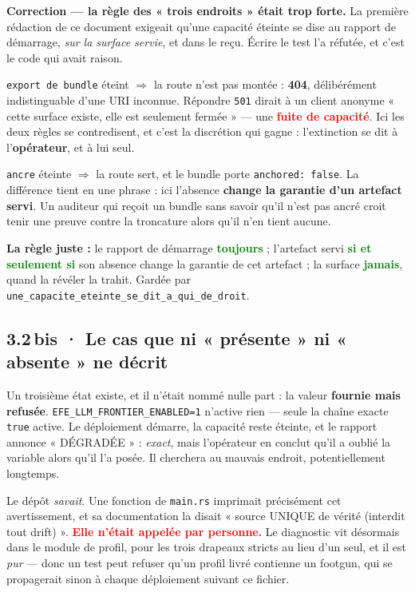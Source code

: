 \documentclass[10pt]{article}
\newcommand{\best}[1]{\textcolor{green}{\textbf{#1}}}
\newcommand{\pire}[1]{\textcolor{red}{\textbf{#1}}}
\newcommand{\code}[1]{\texttt{\small #1}}
\begin{document}
\begin{alerte}
\textbf{Correction --- la règle des « trois endroits » était trop forte.} La première rédaction de
ce document exigeait qu'une capacité éteinte se dise au rapport de démarrage, \emph{sur la surface
servie}, et dans le reçu. Écrire le test l'a réfutée, et c'est le code qui avait raison.

\code{export de bundle} éteint $\Rightarrow$ la route n'est pas montée : \textbf{404}, délibérément
indistinguable d'une URI inconnue. Répondre \code{501} dirait à un client anonyme « cette surface
existe, elle est seulement fermée » --- une \pire{fuite de capacité}. Ici les deux règles se
contredisent, et c'est la discrétion qui gagne : l'extinction se dit à l'\textbf{opérateur}, et à
lui seul.

\code{ancre} éteinte $\Rightarrow$ la route sert, et le bundle porte \code{anchored: false}. La
différence tient en une phrase : ici l'absence \textbf{change la garantie d'un artefact servi}. Un
auditeur qui reçoit un bundle sans savoir qu'il n'est pas ancré croit tenir une preuve contre la
troncature alors qu'il n'en tient aucune.

\medskip
\textbf{La règle juste :} le rapport de démarrage \best{toujours} ; l'artefact servi \best{si et
seulement si} son absence change la garantie de cet artefact ; la surface \best{jamais}, quand la
révéler la trahit. Gardée par \code{une\_capacite\_eteinte\_se\_dit\_a\_qui\_de\_droit}.
\end{alerte}

\subsection{3.2\,bis · Le cas que ni « présente » ni « absente » ne décrit}

Un troisième état existe, et il n'était nommé nulle part : la valeur \textbf{fournie mais refusée}.
\code{EFE\_LLM\_FRONTIER\_ENABLED=1} n'active rien --- seule la chaîne exacte \code{true} active. Le
déploiement démarre, la capacité reste éteinte, et le rapport annonce « DÉGRADÉE » : \emph{exact},
mais l'opérateur en conclut qu'il a oublié la variable alors qu'il l'a posée. Il cherchera au
mauvais endroit, potentiellement longtemps.

Le dépôt \emph{savait}. Une fonction de \code{main.rs} imprimait précisément cet avertissement, et
sa documentation la disait « source UNIQUE de vérité (interdit tout drift) ». \pire{Elle n'était
appelée par personne.} Le diagnostic vit désormais dans le module de profil, pour les trois drapeaux
stricts au lieu d'un seul, et il est \emph{pur} --- donc un test peut refuser qu'un profil livré
contienne un footgun, qui se propagerait sinon à chaque déploiement suivant ce fichier.
\end{document}
